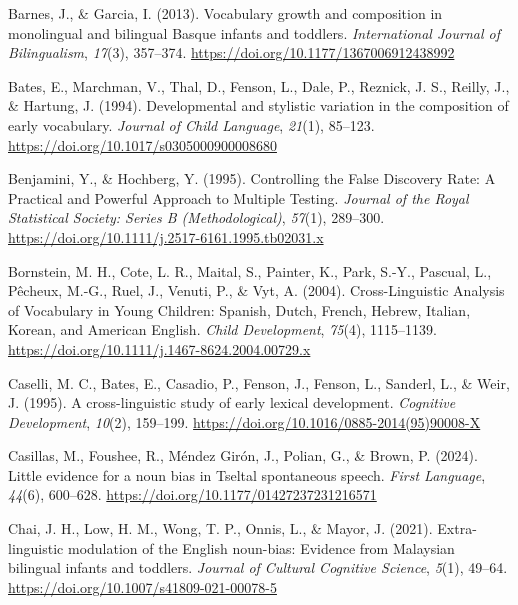 \documentclass[10pt, letterpaper]{article}
\begin{document}
\begin{CSLReferences}{1}{0}
Barnes, J., \& Garcia, I. (2013). Vocabulary growth and composition in
monolingual and bilingual {Basque} infants and toddlers.
\emph{International Journal of Bilingualism}, \emph{17}(3), 357--374.
\url{https://doi.org/10.1177/1367006912438992}

Bates, E., Marchman, V., Thal, D., Fenson, L., Dale, P., Reznick, J. S.,
Reilly, J., \& Hartung, J. (1994). Developmental and stylistic variation
in the composition of early vocabulary. \emph{Journal of Child
Language}, \emph{21}(1), 85--123.
\url{https://doi.org/10.1017/s0305000900008680}

Benjamini, Y., \& Hochberg, Y. (1995). Controlling the {False Discovery
Rate}: {A Practical} and {Powerful Approach} to {Multiple Testing}.
\emph{Journal of the Royal Statistical Society: Series B
(Methodological)}, \emph{57}(1), 289--300.
\url{https://doi.org/10.1111/j.2517-6161.1995.tb02031.x}

Bornstein, M. H., Cote, L. R., Maital, S., Painter, K., Park, S.-Y.,
Pascual, L., Pêcheux, M.-G., Ruel, J., Venuti, P., \& Vyt, A. (2004).
Cross-{Linguistic Analysis} of {Vocabulary} in {Young Children}:
{Spanish}, {Dutch}, {French}, {Hebrew}, {Italian}, {Korean}, and
{American English}. \emph{Child Development}, \emph{75}(4), 1115--1139.
\url{https://doi.org/10.1111/j.1467-8624.2004.00729.x}

Caselli, M. C., Bates, E., Casadio, P., Fenson, J., Fenson, L., Sanderl,
L., \& Weir, J. (1995). A cross-linguistic study of early lexical
development. \emph{Cognitive Development}, \emph{10}(2), 159--199.
\url{https://doi.org/10.1016/0885-2014(95)90008-X}

Casillas, M., Foushee, R., Méndez Girón, J., Polian, G., \& Brown, P.
(2024). Little evidence for a noun bias in {Tseltal} spontaneous speech.
\emph{First Language}, \emph{44}(6), 600--628.
\url{https://doi.org/10.1177/01427237231216571}

Chai, J. H., Low, H. M., Wong, T. P., Onnis, L., \& Mayor, J. (2021).
Extra-linguistic modulation of the {English} noun-bias: Evidence from
{Malaysian} bilingual infants and toddlers. \emph{Journal of Cultural
Cognitive Science}, \emph{5}(1), 49--64.
\url{https://doi.org/10.1007/s41809-021-00078-5}


\end{CSLReferences}
\end{document}
